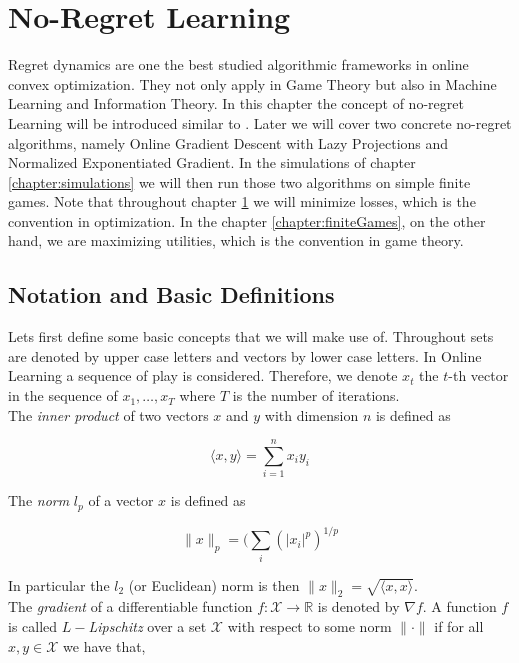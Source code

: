 
\chapter{No-Regret Learning}\label{chapter:noRegretLearning}

Regret dynamics are one the best studied algorithmic frameworks in online convex optimization. They not only apply in Game Theory but also in Machine Learning and Information Theory. In this chapter the concept of no-regret Learning will be introduced similar to \cite[Chapter 2]{HDRmertikopoulos}. Later we will cover two concrete no-regret algorithms, namely Online Gradient Descent with Lazy Projections and Normalized Exponentiated Gradient. In the simulations of chapter \ref{chapter:simulations} we will then run those two algorithms on simple finite games. Note that throughout chapter \ref{chapter:noRegretLearning} we will minimize losses, which is the convention in optimization. In the chapter \ref{chapter:finiteGames}, on the other hand, we are maximizing utilities, which is the convention in game theory.


\section{Notation and Basic Definitions}\label{section:notationAndDefinitionsRegret}

Lets first define some basic concepts that we will make use of. Throughout sets are denoted by upper case letters and vectors by lower case letters. In Online Learning a sequence of play is considered. Therefore, we denote $x_t$ the $t$-th vector in the sequence of $x_1, \dots, x_T$ where $T$ is the number of iterations. \\
The \textit{inner product} of two vectors $x$ and $y$ with dimension $n$ is defined as 

\begin{equation*}
    \langle x,y\rangle = \sum_{i=1}^{n}x_i y_i
\end{equation*}

The \textit{norm} $l_p$ of a vector $x$ is defined as

\begin{equation*}
    \|x\|_p = (\sum_{i}(|x_i|^p)^{1/p}
\end{equation*}

In particular the $l_2$ (or Euclidean) norm is then $\|x\|_2 = \sqrt{\langle x,x\rangle}$. \\

The \textit{gradient} of a differentiable function $f: \mathcal{X} \to \mathbb{R}$ is denoted by $\nabla f$. A function $f$ is called $L-$\textit{Lipschitz} over a set $\mathcal{X}$ with respect to some norm $\|\cdot\|$ if for all $x,y \in \mathcal{X}$ we have that, 

